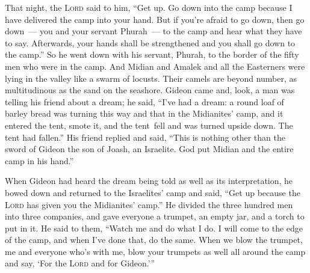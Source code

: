 \begin{inparaenum}
     That night, the \textsc{Lord} said to him, ``Get up. Go down into the camp because I have delivered the camp into your hand.%
     But if you're afraid to go down, then go down~--- you and your servant Phurah~--- to the camp%
     and hear what they have to say. Afterwards, your hands shall be strengthened and you shall go down to the camp.'' So he went down with his servant, Phurah, to the border of the fifty men who were in the camp.%
     And Midian and Amalek and all the Easterners were lying in the valley like a swarm of locusts. Their camels are beyond number, as multitudinous as the sand on the seashore.%
     Gideon came and, look, a man was telling his friend about a dream; he said, ``I've had a dream: a round loaf of barley bread was turning this way and that in the Midianites' camp, and it entered the tent, smote it, and the tent\understood\ fell and was turned upside down. The tent had fallen.''%
     His friend replied and said, ``This is nothing other than the sword of Gideon the son of Joash, an Israelite. God put Midian and the entire camp in his hand.''%
    
     When Gideon had heard the dream being told as well as its interpretation, he bowed down and returned to the Israelites' camp and said, ``Get up because the \textsc{Lord} has given you the Midianites' camp.''%
     He divided the three hundred men into three companies, and gave everyone a trumpet, an empty jar, and a torch to put in it.%
     He said to them, ``Watch me and do what I do. I will come to the edge of the camp, and when I've done that, do the same.%
     When we blow the trumpet, me and everyone who's with me, blow your trumpets as well all around the camp and say, `For the \textsc{Lord} and for Gideon.'\thinspace''%
    

\end{inparaenum}
